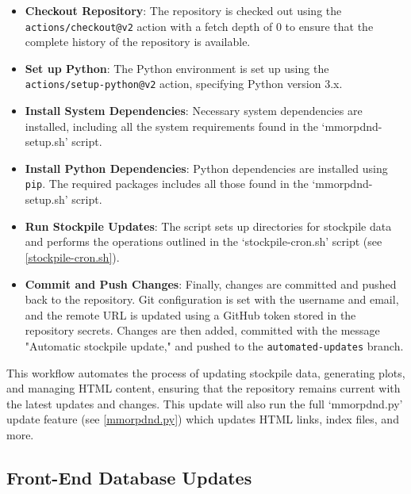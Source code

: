 \begin{itemize}
    \item \textbf{Checkout Repository}: The repository is checked out using the \texttt{actions/checkout@v2} action with a fetch depth of 0 to ensure that the complete history of the repository is available.
    
    \item \textbf{Set up Python}: The Python environment is set up using the \texttt{actions/setup-python@v2} action, specifying Python version 3.x.
    
    \item \textbf{Install System Dependencies}: Necessary system dependencies are installed, including all the system requirements found in the `mmorpdnd-setup.sh' script.
    
    \item \textbf{Install Python Dependencies}: Python dependencies are installed using \texttt{pip}. The required packages includes all those found in the `mmorpdnd-setup.sh' script.
    \item \textbf{Run Stockpile Updates}: The script sets up directories for stockpile data and performs the operations outlined in the `stockpile-cron.sh' script (see \ref{stockpile-cron.sh}).
    
    \item \textbf{Commit and Push Changes}: Finally, changes are committed and pushed back to the repository. Git configuration is set with the username and email, and the remote URL is updated using a GitHub token stored in the repository secrets. Changes are then added, committed with the message "Automatic stockpile update," and pushed to the \texttt{automated-updates} branch.
\end{itemize}

This workflow automates the process of updating stockpile data, generating plots, and managing HTML content, ensuring that the repository remains current with the latest updates and changes. This update will also run the full `mmorpdnd.py' update feature (see \ref{mmorpdnd.py}) which updates HTML links, index files, and more.









\subsection{Front-End Database Updates}

